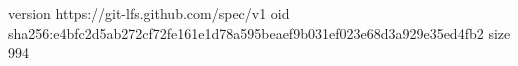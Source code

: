 version https://git-lfs.github.com/spec/v1
oid sha256:e4bfc2d5ab272cf72fe161e1d78a595beaef9b031ef023e68d3a929e35ed4fb2
size 994

